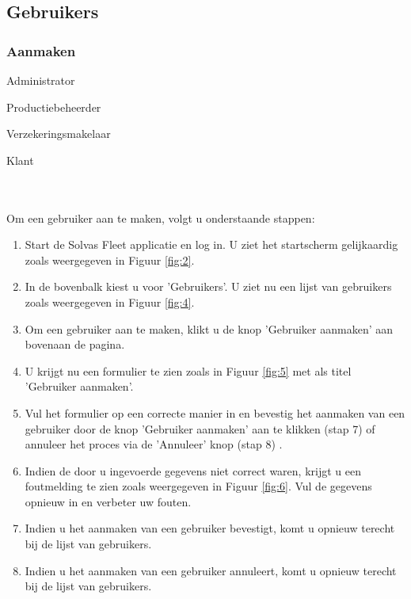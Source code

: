 \documentclass[11pt,openany]{article}
\newcommand{\cmark}{\ding{51}}%
\newcommand{\xmark}{\ding{55}}%
\newcommand{\done}{\rlap{$\square$}{\raisebox{2pt}{\large\hspace{1pt}\cmark}}%
	\hspace{-2.5pt}}
\newcommand{\wontfix}{\rlap{$\square$}{\large\hspace{1pt}\xmark}}
\begin{document}
\newpage
\subsection{Gebruikers}
\subsubsection{Aanmaken}

\begin{todolist}
	\item[\done] Administrator
	\item[\wontfix] Productiebeheerder
	\item[\wontfix] Verzekeringsmakelaar
	\item[\wontfix] Klant 
\end{todolist}
\\
\\
Om een gebruiker aan te maken, volgt u onderstaande stappen:
\begin{enumerate}
	\item Start de Solvas Fleet applicatie en log in. U ziet het startscherm gelijkaardig zoals weergegeven in Figuur \ref{fig:2}.
	\item In de bovenbalk kiest u voor 'Gebruikers'. U ziet nu een lijst van gebruikers zoals weergegeven in Figuur \ref{fig:4}.
	\item Om een gebruiker aan te maken, klikt u de knop 'Gebruiker aanmaken' aan bovenaan de pagina. 
	\item U krijgt nu een formulier te zien zoals in Figuur \ref{fig:5} met als titel 'Gebruiker aanmaken'.
	\item Vul het formulier op een correcte manier in en bevestig het aanmaken van een gebruiker door de knop 'Gebruiker aanmaken' aan te klikken (stap 7) of annuleer het proces via de 'Annuleer' knop (stap 8) .
	\item Indien de door u ingevoerde gegevens niet correct waren, krijgt u een foutmelding te zien zoals weergegeven in Figuur \ref{fig:6}. Vul de gegevens opnieuw in en verbeter uw fouten.
	\item Indien u het aanmaken van een gebruiker bevestigt, komt u opnieuw terecht bij de lijst van gebruikers. 
	\item Indien u het aanmaken van een gebruiker annuleert, komt u opnieuw terecht bij de lijst van gebruikers.
	
\end{enumerate}
\end{document}
